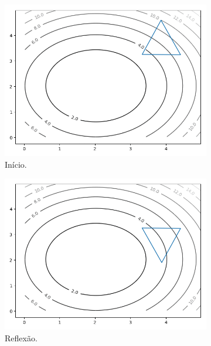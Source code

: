 \begin{figure}
\centering
\begin{subfigure}{.3\textwidth}
  \centering
  \includegraphics[width=\linewidth]{figs/neldermeadexample/target-0.png}
\caption{Início.}
\end{subfigure}%
\begin{subfigure}{.3\textwidth}
  \centering
  \includegraphics[width=\linewidth]{figs/neldermeadexample/target-1.png}
   \caption{Reflexão.}
\end{subfigure}
\begin{subfigure}{.3\textwidth}
  \centering

\end{subfigure}
\end{figure}

